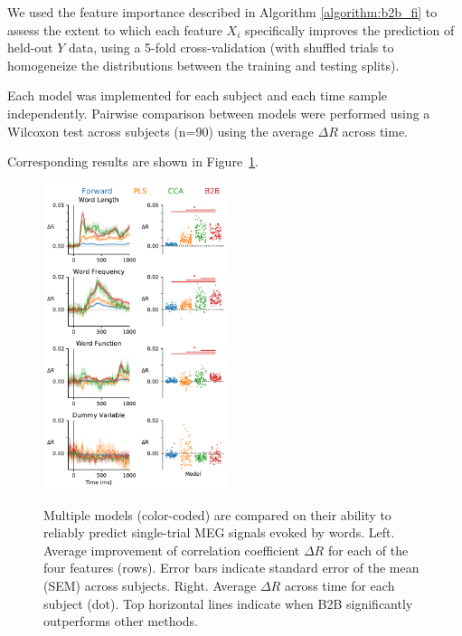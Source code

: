 We used the feature importance described in Algorithm \ref{algorithm:b2b_fi} to assess the extent to which each feature $X_i$ specifically improves the prediction of held-out $Y$ data, using a 5-fold cross-validation (with shuffled trials to homogeneize the distributions between the training and testing splits).

Each model was implemented for each subject and each time sample independently. Pairwise comparison between models were performed using a Wilcoxon test across subjects (n=90) using the average $\Delta R$ across time.

Corresponding results are shown in Figure~\ref{fig:meg_results}.



\begin{figure}
  \vspace{-12ex}
  \begin{center}
    \includegraphics[width=0.48\textwidth, trim=0cm 0cm 0cm 0cm, clip=True]{figures/meg.pdf}

    \label{fig:meg_results}
  \end{center}
  \caption{Multiple models (color-coded) are compared on their ability to reliably predict single-trial MEG signals evoked by words. Left. Average improvement of correlation coefficient $\Delta R$ for each of the four features (rows). Error bars indicate standard error of the mean (SEM) across subjects. Right. Average $\Delta R$ across time for each subject (dot). Top horizontal lines indicate when B2B significantly outperforms other methods.}
  \vspace{-9ex}
\end{figure}

